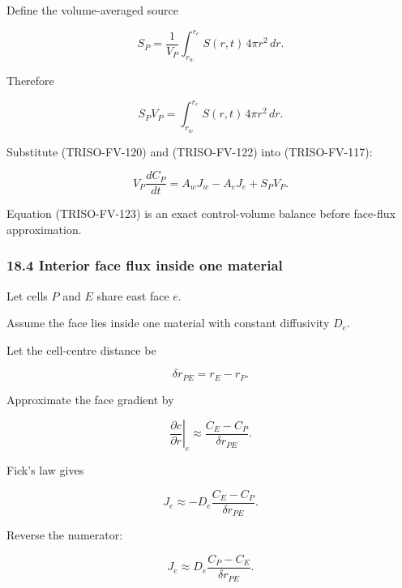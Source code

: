 \documentclass[11pt,a4paper]{article}
\begin{document}
Define the volume-averaged source

\begin{equation}
\boxed{
S_P
=
\frac1{V_P}
\int_{r_w}^{r_e}
S(r,t)\,4\pi r^2\,dr.
}
\tag{TRISO-FV-121}
\label{eq:triso-fv-121}
\end{equation}

Therefore

\begin{equation}
S_PV_P
=
\int_{r_w}^{r_e}
S(r,t)\,4\pi r^2\,dr.
\tag{TRISO-FV-122}
\label{eq:triso-fv-122}
\end{equation}

Substitute (TRISO-FV-120) and (TRISO-FV-122) into (TRISO-FV-117):

\begin{equation}
\boxed{
V_P\frac{dC_P}{dt}
=
A_wJ_w-A_eJ_e+S_PV_P.
}
\tag{TRISO-FV-123}
\label{eq:triso-fv-123}
\end{equation}

Equation (TRISO-FV-123) is an exact control-volume balance before face-flux approximation.

\subsubsection*{18.4 Interior face flux inside one material}

Let cells $P$ and $E$ share east face $e$.

Assume the face lies inside one material with constant diffusivity $D_e$.

Let the cell-centre distance be

\begin{equation}
\delta r_{PE}=r_E-r_P.
\tag{TRISO-FV-124}
\label{eq:triso-fv-124}
\end{equation}

Approximate the face gradient by

\begin{equation}
\left.
\frac{\partial c}{\partial r}
\right|_e
\approx
\frac{C_E-C_P}{\delta r_{PE}}.
\tag{TRISO-FV-125}
\label{eq:triso-fv-125}
\end{equation}

Fick's law gives

\begin{equation}
J_e
\approx
-D_e
\frac{C_E-C_P}{\delta r_{PE}}.
\tag{TRISO-FV-126}
\label{eq:triso-fv-126}
\end{equation}

Reverse the numerator:

\begin{equation}
\boxed{
J_e
\approx
D_e
\frac{C_P-C_E}{\delta r_{PE}}.
}
\tag{TRISO-FV-127}
\label{eq:triso-fv-127}
\end{equation}
\end{document}
